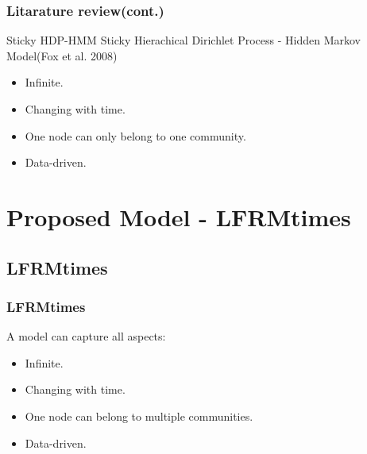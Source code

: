 \documentclass{beamer}
\begin{document}

\begin{frame}
\frametitle{Litarature review(cont.)}
\begin{block}{Sticky HDP-HMM}
Sticky Hierachical Dirichlet Process - Hidden Markov Model(Fox et al. 2008)
\begin{itemize}
\item Infinite.
\item Changing with time.
\item One node can only belong to one community.
\item Data-driven.
\end{itemize}
\end{block}

\end{frame}


\section{Proposed Model - LFRMtimes}

\subsection{LFRMtimes} %

\begin{frame}
\frametitle{LFRMtimes}
A model can capture all aspects:
\begin{itemize}
\item Infinite.
\item Changing with time.
\item One node can belong to multiple communities.
\item Data-driven.
\end{itemize}
\end{frame}

\end{document}
